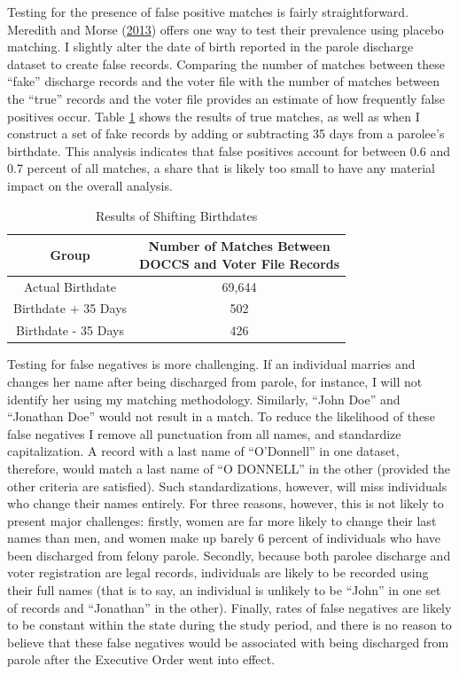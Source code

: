 \documentclass[
  12pt,
]{article}
\begin{document}
Testing for the presence of false positive matches is fairly straightforward. Meredith and Morse (\protect\hyperlink{ref-Meredith2013}{2013}) offers one way to test their prevalence using placebo matching. I slightly alter the date of birth reported in the parole discharge dataset to create false records. Comparing the number of matches between these ``fake'' discharge records and the voter file with the number of matches between the ``true'' records and the voter file provides an estimate of how frequently false positives occur. Table \ref{tab:change-dobs} shows the results of true matches, as well as when I construct a set of fake records by adding or subtracting 35 days from a parolee's birthdate. This analysis indicates that false positives account for between 0.6 and 0.7 percent of all matches, a share that is likely too small to have any material impact on the overall analysis.

\begin{singlespace}
\begin{table}[H]

\caption{\label{tab:shift-dobs-chunk}\label{tab:change-dobs} Results of Shifting Birthdates}
\centering
\begin{tabular}[t]{cc}
\toprule
Group & \makecell[l]{Number of Matches Between\\DOCCS and Voter File Records}\\
\midrule
Actual Birthdate & 69,644\\
Birthdate + 35 Days & 502\\
Birthdate - 35 Days & 426\\
\bottomrule
\end{tabular}
\end{table}
\end{singlespace}

Testing for false negatives is more challenging. If an individual marries and changes her name after being discharged from parole, for instance, I will not identify her using my matching methodology. Similarly, ``John Doe'' and ``Jonathan Doe'' would not result in a match. To reduce the likelihood of these false negatives I remove all punctuation from all names, and standardize capitalization. A record with a last name of ``O'Donnell'' in one dataset, therefore, would match a last name of ``O DONNELL'' in the other (provided the other criteria are satisfied). Such standardizations, however, will miss individuals who change their names entirely. For three reasons, however, this is not likely to present major challenges: firstly, women are far more likely to change their last names than men, and women make up barely 6 percent of individuals who have been discharged from felony parole. Secondly, because both parolee discharge and voter registration are legal records, individuals are likely to be recorded using their full names (that is to say, an individual is unlikely to be ``John'' in one set of records and ``Jonathan'' in the other). Finally, rates of false negatives are likely to be constant within the state during the study period, and there is no reason to believe that these false negatives would be associated with being discharged from parole after the Executive Order went into effect.
\end{document}
